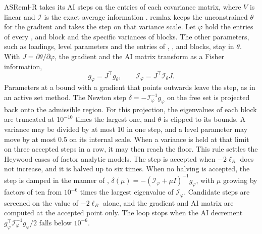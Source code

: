 \documentclass[article,nojss]{jss}
\renewcommand{\pkg}[1]{#1}
\begin{document}
\pkg{ASReml-R} takes its AI steps on the entries of each covariance matrix,
where $V$ is linear and $\mathcal{I}$ is the exact average information
\citep{gilmour2019}. \pkg{remlax} keeps the unconstrained $\theta$ for the
gradient and takes the step on that variance scale. Let $\varphi$ hold the
entries of every ,  and  block and the specific
variances of  blocks. The other parameters, such as loadings, level parameters and
the entries of , ,  and  blocks,
stay in $\theta$. With $J = \partial\theta/\partial\varphi$, the
gradient and the AI matrix transform as a Fisher information,
\begin{equation}\label{eq:phi}
  g_\varphi = J^\top g_\theta, \qquad \mathcal{I}_\varphi = J^\top
  \mathcal{I}_\theta J .
\end{equation}
Parameters at a bound with a gradient that points outwards leave the step, as
in an active set method. The Newton step $\delta = -\mathcal{I}_\varphi^{-1}
g_\varphi$ on the free set is projected back onto the admissible region. For
this projection, the eigenvalues of each  block are truncated at
$10^{-10}$ times the largest one, and $\theta$ is clipped to its bounds. A variance may be divided
by at most 10 in one step, and a level parameter may move by at most 0.5 on
its internal scale. When a variance is held at that limit on three accepted
steps in a row, it may then reach the floor. This rule settles the Heywood
cases of factor analytic models. The step is accepted when $-2\ell_R$ does not
increase, and it is halved up to six times. When no halving is accepted, the
step is damped in the manner
of \citet{marquardt1963}, $\delta(\mu) = -(\mathcal{I}_\varphi + \mu I)^{-1}
g_\varphi$, with $\mu$ growing by factors of ten from $10^{-6}$ times the
largest eigenvalue of $\mathcal{I}_\varphi$. Candidate steps are screened on
the value of $-2\ell_R$ alone, and the gradient and AI matrix are computed at
the accepted point only. The loop stops when the AI decrement
$g_\varphi^\top \mathcal{I}_\varphi^{-1} g_\varphi/2$ falls below $10^{-6}$.
\end{document}
